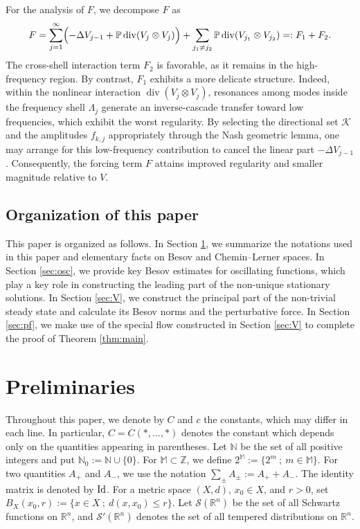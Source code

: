 \documentclass[a4paper,12pt,reqno]{amsart}
\theoremstyle{plain}
\theoremstyle{definition}
\renewcommand{\div}{\operatorname{div}}
\renewcommand{\leq}{\leqslant}
\newcommand{\Id}{{\rm Id}}
\newcommand{\N}{\mathbb{N}}
\newcommand{\Z}{\mathbb{Z}}
\begin{document}
For the analysis of $F$, we decompose $F$ as
\begin{align}
    F
  = \sum_{j=1}^{\infty}\Bigl(-\Delta V_{j-1}+\mathbb{P}\div(V_j\otimes V_j)\Bigr)
    + \sum_{j_1\neq j_2}\mathbb{P}\div(V_{j_1}\otimes V_{j_2})
    =:F_1+F_2.
\end{align}
The cross-shell interaction term $F_2$ is favorable, as it remains in the high-frequency region. By contrast, $F_1$ exhibits a  more delicate structure. Indeed, within the nonlinear interaction $\div(V_{j}\otimes V_j)$, resonances among modes inside the frequency shell $\Lambda_j$ generate an inverse-cascade transfer toward low frequencies, which exhibit the worst regularity. 
By selecting the directional set $\mathcal{K}$ and the amplitudes $f_{k,j}$ appropriately through the Nash geometric lemma, one may arrange for this low-frequency contribution to cancel the linear part $-\Delta V_{j-1}$. Consequently, the forcing term $F$ attains improved regularity and smaller magnitude relative to $V$.




\subsection{Organization of this paper}
This paper is organized as follows.
In Section \ref{sec:pre}, we summarize the notations used in this paper and elementary facts on Besov and Chemin--Lerner spaces.
In Section \ref{sec:osc}, we provide key Besov estimates for oscillating functions, which play a key role in constructing the leading part of the non-unique stationary solutions.
In Section \ref{sec:V}, we construct the principal part of the non-trivial steady state and calculate its Besov norms and the perturbative force.
In Section \ref{sec:pf}, we make use of the special flow constructed in Section \ref{sec:V} to complete the proof of Theorem \ref{thm:main}.


\section{Preliminaries}\label{sec:pre}
Throughout this paper, we denote by $C$ and $c$ the constants, which may differ in each line. In particular, $C=C(*,...,*)$ denotes the constant which depends only on the quantities appearing in parentheses. 
Let $\N$ be the set of all positive integers and put $\N_0:=\N \cup \{0\}$.
For $\mathbb{M} \subset \Z$, we define $2^{\mathbb{M}}:=\{2^m\ ;\ m \in \mathbb{M}\}$.
For two quantities $A_+$ and $A_-$, we use the notation
$\sum_{\pm} A_\pm := A_+ + A_-$.
The identity matrix is denoted by $\Id$.
For a metric space $(X,d)$, $x_0 \in X$, and $r>0$, set $B_X(x_0,r):=\{x \in X\ ;\ d(x,x_0) \leq r\}$.
Let $\mathscr{S}(\mathbb{R}^n)$ be the set of all Schwartz functions on $\mathbb{R}^n$, and 
$\mathscr{S}'(\mathbb{R}^n)$ denotes the set of all tempered distributions on $\mathbb{R}^n$.
\end{document}
